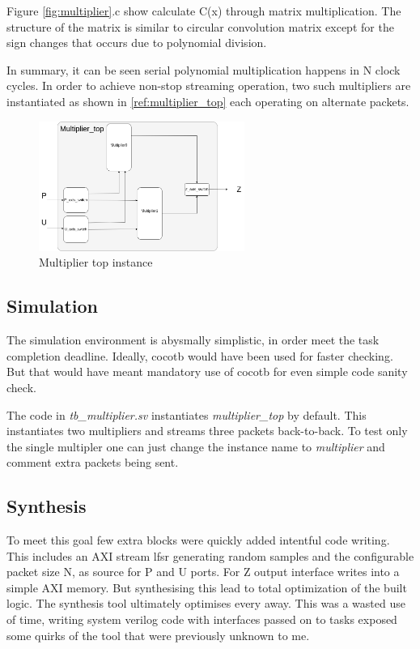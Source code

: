 \documentclass{article}
\begin{document}
    Figure \ref{fig:multiplier}.c show calculate C(x) through matrix multiplication. The structure of the matrix is similar to circular 
    convolution matrix except for the sign changes that occurs due to polynomial division.

    In summary, it can be seen serial polynomial multiplication happens in N clock cycles. In order to achieve non-stop streaming operation, two such
    multipliers are instantiated as shown in \ref{ref:multiplier_top} each operating on alternate packets.

    \begin{figure}[htp] 
      \centering
      \includegraphics[width=0.6\textwidth]{multiplier_top.png}
      \caption{Multiplier top instance}
      \label{fig:multiplier_top} 
    \end{figure}

    \subsection{Simulation}
    The simulation environment is abysmally simplistic, in order meet the task completion deadline. Ideally, cocotb would have
    been used for faster checking. But that would have meant mandatory use of cocotb for even simple code sanity check. 

    The code in \textit{tb\_multiplier.sv} instantiates \textit{multiplier\_top} by default. This instantiates two multipliers 
    and streams three packets back-to-back. To test only the single multipler one can just change the instance name to \textit{multiplier} 
    and comment extra packets being sent. 

    \subsection{Synthesis}
    To meet this goal few extra blocks were quickly added intentful code writing. 
    This includes an AXI stream lfsr generating random samples and the configurable packet size N, as source for P and U 
    ports. For Z output interface writes into a simple AXI memory. 
    But synthesising this lead to total optimization of the built logic. The synthesis tool ultimately optimises every away.
    This was a wasted use of time, writing system verilog code with interfaces passed on to tasks exposed some quirks of the tool that were previously unknown to me.  
    
\end{document}
